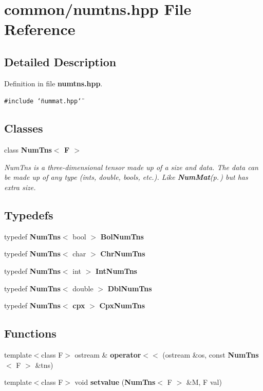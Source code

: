 \section{common/numtns.hpp File Reference}
\label{numtns_8hpp}


\subsection{Detailed Description}


Definition in file {\bf numtns.hpp}.

{\tt \#include \char`\"{}nummat.hpp\char`\"{}}\par
\subsection*{Classes}
\begin{CompactItemize}
\item 
class {\bf Num\-Tns$<$ F $>$}
\begin{CompactList}\small\item\em Num\-Tns is a three-dimensional tensor made up of a size and data. The data can be made up of any type (ints, double, bools, etc.). Like {\bf Num\-Mat}{\rm (p.\,\pageref{classNumMat})} but has extra size. \item\end{CompactList}\end{CompactItemize}
\subsection*{Typedefs}
\begin{CompactItemize}
\item 
typedef {\bf Num\-Tns}$<$ bool $>$ {\bf Bol\-Num\-Tns}
\item 
typedef {\bf Num\-Tns}$<$ char $>$ {\bf Chr\-Num\-Tns}
\item 
typedef {\bf Num\-Tns}$<$ int $>$ {\bf Int\-Num\-Tns}
\item 
typedef {\bf Num\-Tns}$<$ double $>$ {\bf Dbl\-Num\-Tns}
\item 
typedef {\bf Num\-Tns}$<$ {\bf cpx} $>$ {\bf Cpx\-Num\-Tns}
\end{CompactItemize}
\subsection*{Functions}
\begin{CompactItemize}
\item 
template$<$class F$>$ ostream \& {\bf operator$<$$<$} (ostream \&os, const {\bf Num\-Tns}$<$ F $>$ \&tns)
\item 
template$<$class F$>$ void {\bf setvalue} ({\bf Num\-Tns}$<$ F $>$ \&M, F val)
\end{CompactItemize}


